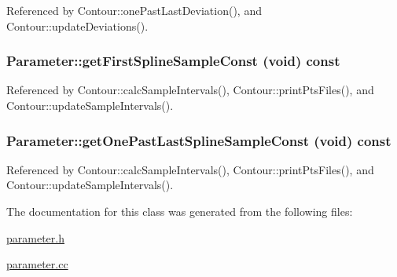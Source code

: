 Referenced by Contour::onePastLastDeviation(), and Contour::updateDeviations().\hypertarget{classParameter_7006d1d623467ddf4c94724503ee77d5}{
\subsubsection[getFirstSplineSampleConst]{ Parameter::getFirstSplineSampleConst (void) const}}
\label{classParameter_7006d1d623467ddf4c94724503ee77d5}




Referenced by Contour::calcSampleIntervals(), Contour::printPtsFiles(), and Contour::updateSampleIntervals().\hypertarget{classParameter_bab72e16fa4732267560e6b0b661fb8b}{
\subsubsection[getOnePastLastSplineSampleConst]{ Parameter::getOnePastLastSplineSampleConst (void) const}}
\label{classParameter_bab72e16fa4732267560e6b0b661fb8b}




Referenced by Contour::calcSampleIntervals(), Contour::printPtsFiles(), and Contour::updateSampleIntervals().

The documentation for this class was generated from the following files:\begin{CompactItemize}
\item 
\hyperlink{parameter_8h}{parameter.h}\item 
\hyperlink{parameter_8cc}{parameter.cc}\end{CompactItemize}
